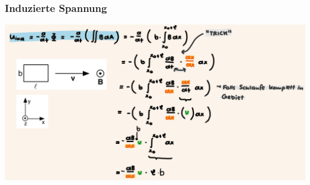         \subsubsection{Induzierte Spannung}
        \includegraphics*[width=\linewidth]{src/images/Bsp_induktion_v_aus_abl.png}